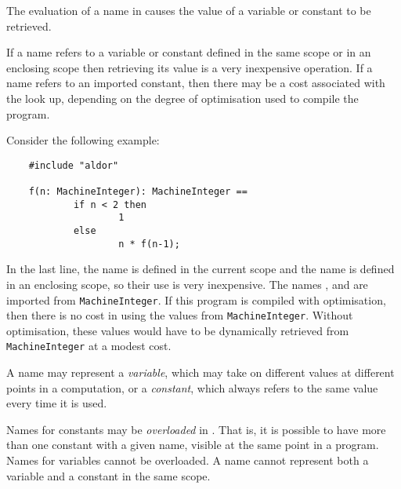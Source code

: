 
The evaluation of a name in \asharp{} causes the value of a
variable or constant to be retrieved.  

If a name refers to a variable or constant defined in the same scope or in
an enclosing scope then retrieving its value is a very inexpensive operation.  
If a name refers to an imported constant, then there may be a cost associated
with the look up, depending on the degree of optimisation used to compile the
program.

Consider the following example:

\begin{small}
\begin{verbatim}
    #include "aldor"

    f(n: MachineInteger): MachineInteger ==
            if n < 2 then
                    1
            else
                    n * f(n-1);
\end{verbatim}
\end{small}

In the last line, the name  is defined in the current scope
and the name  is defined in an enclosing scope, so their use
is very inexpensive.  The names \ttin{*}, \ttin{-} and  are
imported from \verb"MachineInteger".  If this program is compiled with
optimisation, then there is no cost in using the values from
\verb"MachineInteger".  Without optimisation, these values
would have to be dynamically retrieved from \verb"MachineInteger"
at a modest cost.

A name may represent a {\em variable\/}, which may take on different values
at different points in a computation, or a {\em constant\/}, which
always refers to the same value every time it is used.

Names for constants may be {\em overloaded\/} in \asharp{}.  That is,
it is possible to have more than one constant with a given name,
visible at the same point in a program.  Names for variables cannot be
overloaded.  A name cannot represent both a variable and a constant in
the same scope. 


